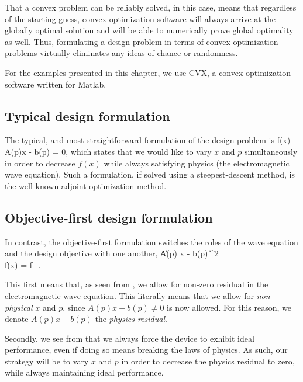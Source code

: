 That a convex problem can be reliably solved, in this case, 
    means that regardless of the starting guess,
    convex optimization software will 
    always arrive at the globally optimal solution
    and will be able to numerically prove global optimality as well.
Thus, formulating a design problem in terms of convex optimization problems
    virtually eliminates any ideas of chance or randomness.

For the examples presented in this chapter,
    we use CVX, a convex optimization software written for Matlab. %


\subsection{Typical design formulation}
The typical, and most straightforward formulation
    of the design problem is
\BA {} f(x) \\
    \subto A(p)x - b(p) = 0, \label{eq:typ:eqcon} \EA
    which states that we would like to vary $x$ and $p$ simultaneously
    in order to decrease $f(x)$
    while always satisfying physics (the electromagnetic wave equation).
Such a formulation, if solved using a steepest-descent method,
    is the well-known adjoint optimization method. %

\subsection{Objective-first design formulation}
In contrast, the objective-first formulation switches
    the roles of the wave equation and the design objective
    with one another,
\BA {} \| A(p) x - b(p) \|^2 \label{eq:ob1:1} \\
    \subto f(x) = f_. \label{eq:ob1:2} \EA

This first means that, as seen from ,
    we allow for non-zero residual in the electromagnetic wave equation.
This literally means that we allow for \emph{non-physical} $x$ and $p$,
    since $A(p) x - b(p) \ne 0$ is now allowed.
For this reason, we denote $A(p) x - b(p)$ the \emph{physics residual}.

Secondly, we see from  that we always force the device
    to exhibit ideal performance,
    even if doing so means breaking the laws of physics.
As such, our strategy will be to vary $x$ and $p$
    in order to decrease the physics residual  to zero,
    while always maintaining ideal performance.

